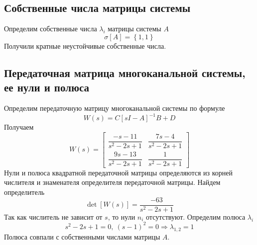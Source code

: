 \documentclass[a4paper, 12pt]{article}
\begin{document}
    \subsection{Собственные числа матрицы системы}
    Определим собственные числа $\lambda_i$ матрицы системы $A$
    $$
    \sigma\left[ A \right]=\left\{ 1,1 \right\}
    $$
    Получили кратные неустойчивые собственные числа.


    \subsection{Передаточная матрица многоканальной системы, ее нули и полюса}
    Определим передаточную матрицу многоканальной системы по формуле
    $$
    W(s)=C\left[ sI-A \right]^{-1}B+D
    $$
    Получаем
    $$
    W(s)=\begin{bmatrix}
        \dfrac{-s-11}{s^2-2s+1}	&\dfrac{7s-4}{s^2-2s+1}\\
        \dfrac{9s-13}{s^2-2s+1}	      &\dfrac{1}{s^2-2s+1}
    \end{bmatrix}
    $$
    Нули и полюса квадратной передаточной матрицы определяются из
    корней числителя и знаменателя определителя передаточной матрицы. Найдем определитель
    $$
    \det{\left[W(s)\right]}=\dfrac{-63}{s^2-2s+1}
    $$
    Так как числитель не зависит от $s$, то нули $n_i$ отсутствуют.
    Определим полюса $\lambda_i$
    $$
    s^2-2s+1=0,\ \left( s-1 \right)^2=0\Rightarrow \lambda_{1,2}=1
    $$
    Полюса совпали с собственными числами матрицы $A$.
\end{document}
